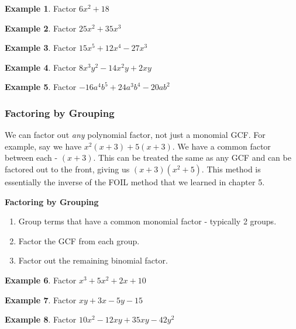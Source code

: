 \documentclass[addpoints,12pt]{exam}
\theoremstyle{definition}
\theoremstyle{break}
\theoremstyle{break}
\newtheorem{example}{Example}[subsection]
\begin{document}
\vspace{.15in}

\begin{example}
Factor $6x^2 + 18$
\vspace{1in}
\end{example}

\begin{example}
Factor $25x^2 + 35x^3$
\vspace{1.25in}
\end{example}

\begin{example}
Factor $15x^5 + 12x^4 - 27x^3$
\end{example}

\newpage

\begin{example}
Factor $8x^3y^2 - 14x^2y + 2xy$
\vspace{1.25in}
\end{example}

\begin{example}
Factor $-16a^4b^5 + 24a^3b^4 - 20ab^2$
\vspace{1.5in}
\end{example}

\subsubsection*{Factoring by Grouping}
We can factor out \emph{any} polynomial factor, not just a monomial GCF.
\vspace{.15in}
For example, say we have $x^2(x+3) + 5(x+3)$. We have a common factor between each - $(x+3)$. This can be treated the same as any GCF and can be factored out to the front, giving us $(x+3)(x^2+5)$. This method is essentially the inverse of the FOIL method that we learned in chapter 5.
\vspace{.15in}

\begin{mdframed}
\textbf{Factoring by Grouping}
\begin{enumerate}
\item Group terms that have a common monomial factor - typically 2 groups.
\item Factor the GCF from each group.
\item Factor out the remaining binomial factor.
\end{enumerate}
\end{mdframed}

\newpage

\begin{example}
Factor $x^3 + 5x^2 + 2x + 10$
\vspace{2.25in}
\end{example}

\begin{example}
Factor $xy + 3x - 5y - 15$
\vspace{2.25in}
\end{example}

\begin{example}
Factor $10x^2 - 12xy + 35xy - 42y^2$
\end{example}
\end{document}
